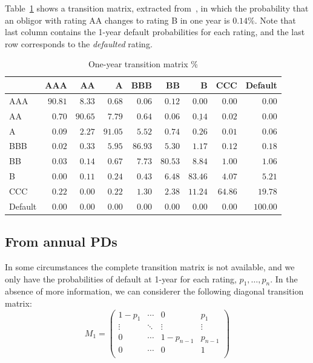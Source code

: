 \documentclass[11pt,fleqn]{book} %
\begin{document}
\begin{example}
	\label{ex:1ytm}
	Table~\ref{tmatrix1} shows a transition matrix, extracted 
	from~\cite[p. 20]{cmetrics:1997}, in which the probability that an obligor 
	with rating AA changes to rating B in one year is $0.14\%$. Note that 
	last column contains the 1-year default probabilities for each rating, and 
	the last row corresponds to the \emph{defaulted} rating.
	\begin{table}[!ht]
		\begin{center}
			\begin{tabular}[]{l|rrrrrrrr}
				        & AAA     & AA      & A       & BBB     & BB      & B                  & CCC     & Default  \\
				\hline
				AAA     & $90.81$ & $8.33$  & $0.68$  & $0.06$  & $0.12$  & $0.00$             & $0.00$  & $0.00$   \\
				AA      & $0.70$  & $90.65$ & $7.79$  & $0.64$  & $0.06$  & $\underline{0.14}$ & $0.02$  & $0.00$   \\
				A       & $0.09$  & $2.27$  & $91.05$ & $5.52$  & $0.74$  & $0.26$             & $0.01$  & $0.06$   \\
				BBB     & $0.02$  & $0.33$  & $5.95$  & $86.93$ & $5.30$  & $1.17$             & $0.12$  & $0.18$   \\
				BB      & $0.03$  & $0.14$  & $0.67$  & $7.73$  & $80.53$ & $8.84$             & $1.00$  & $1.06$   \\
				B       & $0.00$  & $0.11$  & $0.24$  & $0.43$  & $6.48$  & $83.46$            & $4.07$  & $5.21$   \\
				CCC     & $0.22$  & $0.00$  & $0.22$  & $1.30$  & $2.38$  & $11.24$            & $64.86$ & $19.78$  \\
				Default & $0.00$  & $0.00$  & $0.00$  & $0.00$  & $0.00$  & $0.00$             & $0.00$  & $100.00$ \\
			\end{tabular}
			\caption{One-year transition matrix \%}
			\label{tmatrix1}
		\end{center}
	\end{table}
\end{example}

\subsection{From annual PDs}
\label{pdfsv}

In some circumstances the complete transition matrix is not available, 
and we only have the probabilities of default at 1-year for each rating, 
$p_1,\dots,p_n$. In the absence of more information, we can considerer 
the following diagonal transition matrix:
\begin{displaymath}
	M_1 = \left(
	\begin{array}{cccc}
		1-p_1  & \cdots & 0         & p_1     \\
		\vdots & \ddots & \vdots    & \vdots  \\
		0      & \cdots & 1-p_{n-1} & p_{n-1} \\
		0      & \cdots & 0         & 1       \\
	\end{array}
	\right)
\end{displaymath}
\end{document}
